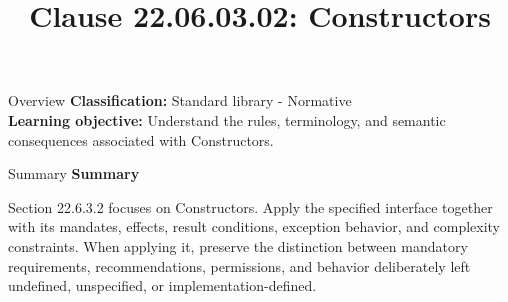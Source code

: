 \documentclass[10pt,letterpaper]{article}
\title{Clause 22.06.03.02: Constructors}
\author{}
\date{}
\begin{document}
\maketitle
\begin{CornellOverviewBox}{Overview}
\textbf{Classification:} Standard library - Normative\\[2pt]
\textbf{Learning objective:} Understand the rules, terminology, and semantic consequences associated with Constructors.
\end{CornellOverviewBox}\begin{CornellSummaryBox}{Summary}
{\sffamily\bfseries\color{Accent} Summary}\par\vspace{3pt}Section 22.6.3.2 focuses on Constructors. Apply the specified interface together with its mandates, effects, result conditions, exception behavior, and complexity constraints. When applying it, preserve the distinction between mandatory requirements, recommendations, permissions, and behavior deliberately left undefined, unspecified, or implementation-defined.
\end{CornellSummaryBox}
\end{document}
